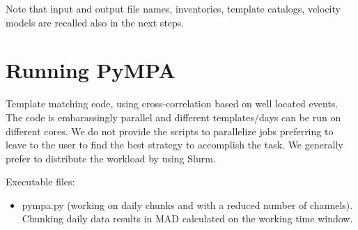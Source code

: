 \documentclass[a4paper,12pt,english]{sphinxmanual}
\begin{document}
\begin{sphinxVerbatim}[commandchars=\\\{\}]
         
  
 
\end{sphinxVerbatim}

Note that input and output file names, inventories, template catalogs, velocity models are recalled also in the next steps.


\section{Running PyMPA}
\label{\detokenize{tutorial:running-pympa}}
Template matching code, using cross-correlation based on well located events. The code is embarassingly parallel and different templates/days can be run on different cores. We do not provide the scripts to parallelize jobs preferring to leave to the user to find the best strategy to accomplish the task. We generally prefer to distribute the workload by using Slurm.

Executable files:
\begin{itemize}
\item {} 
pympa.py (working on daily chunks and with a reduced number of channels). Chunking daily data results in MAD calculated on the working time window.

\end{itemize}
\end{document}

